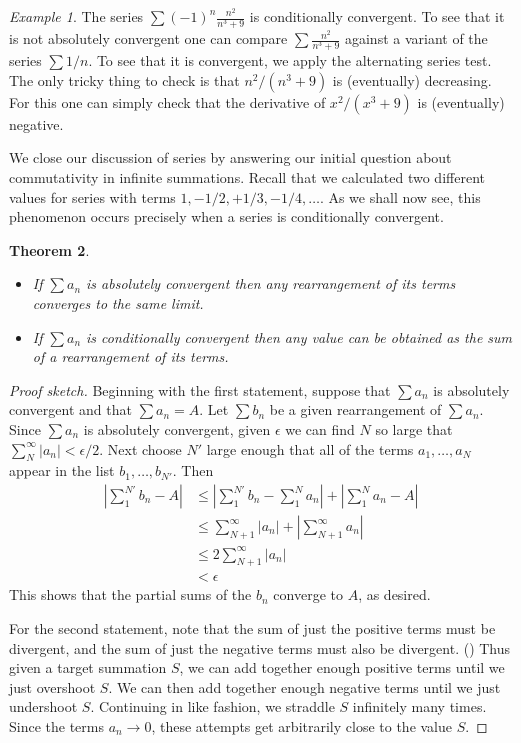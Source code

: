\documentclass[11pt,oneside]{amsbook}
\theoremstyle{definition}
\theoremstyle{plain}
\newtheorem{thm}{Theorem}[section]
\theoremstyle{definition}
\theoremstyle{remark}
\newtheorem{example}[thm]{Example}
\numberwithin{equation}{section}
\numberwithin{figure}{section}
\begin{document}
\begin{example}
  The series $\sum(-1)^n\frac{n^2}{n^3+9}$ is conditionally convergent. To see that it is not absolutely convergent one can compare $\sum\frac{n^2}{n^3+9}$ against a variant of the series $\sum 1/n$. To see that it is convergent, we apply the alternating series test. The only tricky thing to check is that $n^2/(n^3+9)$ is (eventually) decreasing. For this one can simply check that the derivative of $x^2/(x^3+9)$ is (eventually) negative.
\end{example}

We close our discussion of series by answering our initial question about commutativity in infinite summations. Recall that we calculated two different values for series with terms $1,-1/2,+1/3,-1/4,\ldots$. As we shall now see, this phenomenon occurs precisely when a series is conditionally convergent.

\begin{thm}
  \begin{itemize}
  \item If $\sum a_n$ is absolutely convergent then any rearrangement of its terms converges to the same limit.
  \item If $\sum a_n$ is conditionally convergent then any value can be obtained as the sum of a rearrangement of its terms.
  \end{itemize}
\end{thm}

\begin{proof}[Proof sketch]
  Beginning with the first statement, suppose that $\sum a_n$ is absolutely convergent and that $\sum a_n=A$. Let $\sum b_n$ be a given rearrangement of $\sum a_n$. Since $\sum a_n$ is absolutely convergent, given $\epsilon$ we can find $N$ so large that $\sum_N^\infty|a_n|<\epsilon/2$. Next choose $N'$ large enough that all of the terms $a_1,\ldots,a_N$ appear in the list $b_1,\ldots,b_{N'}$. Then
  \begin{align*}
    \left|\sum_1^{N'}b_n-A\right|
    &\leq\left|\sum_1^{N'}b_n-\sum_1^Na_n\right|+\left|\sum_1^Na_n-A\right|\\
    &\leq\sum_{N+1}^\infty|a_n|+\left|\sum_{N+1}^\infty a_n\right|\\
    &\leq2\sum_{N+1}^\infty|a_n|\\
    &<\epsilon
  \end{align*}
  This shows that the partial sums of the $b_n$ converge to $A$, as desired.
  
  For the second statement, note that the sum of just the positive terms must be divergent, and the sum of just the negative terms must also be divergent. () Thus given a target summation $S$, we can add together enough positive terms until we just overshoot $S$. We can then add together enough negative terms until we just undershoot $S$. Continuing in like fashion, we straddle $S$ infinitely many times. Since the terms $a_n\to0$, these attempts get arbitrarily close to the value $S$.
\end{proof}
\end{document}
